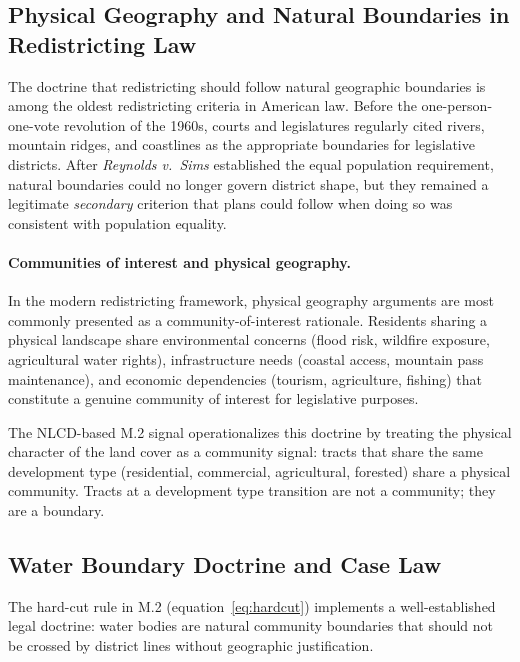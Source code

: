 \label{sec:legal}

\subsection{Physical Geography and Natural Boundaries in Redistricting Law}

The doctrine that redistricting should follow natural geographic boundaries
is among the oldest redistricting criteria in American law.
Before the one-person-one-vote revolution of the 1960s, courts and legislatures
regularly cited rivers, mountain ridges, and coastlines as the appropriate
boundaries for legislative districts.
After \textit{Reynolds v.\ Sims} \citeyearpar{reynolds1964} established
the equal population requirement, natural boundaries could no longer govern
district shape, but they remained a legitimate \emph{secondary} criterion
that plans could follow when doing so was consistent with population equality.

\paragraph{Communities of interest and physical geography.}
In the modern redistricting framework, physical geography arguments are most
commonly presented as a community-of-interest rationale.
Residents sharing a physical landscape share environmental concerns (flood risk,
wildfire exposure, agricultural water rights), infrastructure needs (coastal
access, mountain pass maintenance), and economic dependencies (tourism,
agriculture, fishing) that constitute a genuine community of interest for
legislative purposes.

The NLCD-based M.2 signal operationalizes this doctrine by treating the
physical character of the land cover as a community signal:
tracts that share the same development type (residential, commercial,
agricultural, forested) share a physical community.
Tracts at a development type transition are not a community; they are a
boundary.

\subsection{Water Boundary Doctrine and Case Law}

The hard-cut rule in M.2 (equation~\ref{eq:hardcut}) implements a
well-established legal doctrine: water bodies are natural community
boundaries that should not be crossed by district lines without
geographic justification.

